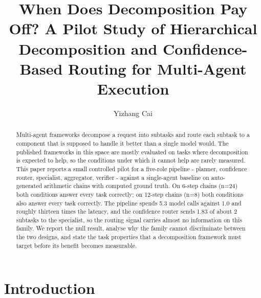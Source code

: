 \documentclass[runningheads,a4paper]{llncs}
\begin{document}
\title{When Does Decomposition Pay Off? A Pilot Study of Hierarchical Decomposition and Confidence-Based Routing for Multi-Agent Execution}


\author{Yizhang Cai}



\maketitle

\begin{abstract}

Multi-agent frameworks decompose a request into subtasks and route each subtask to a component that is supposed to handle it better than a single model would. The published frameworks in this space are mostly evaluated on tasks where decomposition is expected to help, so the conditions under which it cannot help are rarely measured. This paper reports a small controlled pilot for a five-role pipeline - planner, confidence router, specialist, aggregator, verifier - against a single-agent baseline on auto-generated arithmetic chains with computed ground truth. On 6-step chains (n=24) both conditions answer every task correctly; on 12-step chains (n=8) both conditions also answer every task correctly. The pipeline spends 5.3 model calls against 1.0 and roughly thirteen times the latency, and the confidence router sends 1.83 of about 2 subtasks to the specialist, so the routing signal carries almost no information on this family. We report the null result, analyse why the family cannot discriminate between the two designs, and state the task properties that a decomposition framework must target before its benefit becomes measurable.


\end{abstract}

\section{Introduction}
\end{document}
